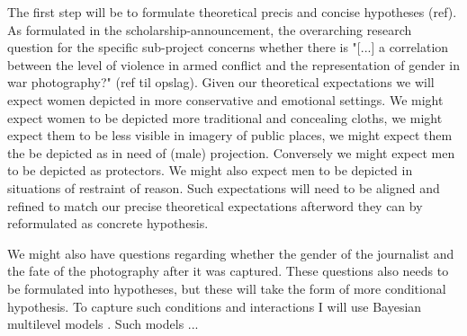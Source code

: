 \documentclass[a4paper]{article}
\begin{document}
The first step will be to formulate theoretical precis and concise hypotheses (ref). As formulated in the scholarship-announcement, the overarching research question for the specific sub-project concerns whether there is "[...] a correlation between the level of violence in armed conflict and the representation of gender in war photography?" (ref til opslag). Given our theoretical expectations we will expect women depicted in more conservative and emotional settings. We might expect women to be depicted more traditional and concealing cloths, we might expect them to be less visible in imagery of public places, we might expect them the be depicted as in need of (male) projection. Conversely we might expect men to be depicted as protectors. We might also expect men to be depicted in situations of restraint of reason. Such expectations will need to be aligned and refined to match our precise theoretical expectations afterword they can by reformulated as concrete hypothesis.\par 

We might also have questions regarding whether the gender of the journalist and the fate of the photography after it was captured. These questions also needs to be formulated into hypotheses, but these will take the form of more conditional hypothesis. To capture such conditions and interactions I will use Bayesian multilevel models \citep{Gelman_2006, Gelman_2013, Mcelreath_2018}. Such models ...\par
\end{document}
